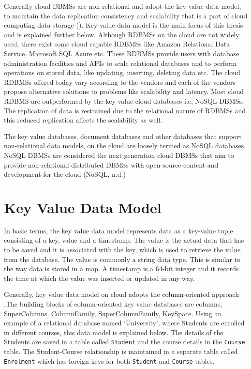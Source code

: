 Generally cloud \acp{DBMS} are non-relational and adopt the key-value data model, to
maintain the data replication consistency and scalability that is a part of
cloud computing data storage (). Key-value data model is the main
focus of this thesis and is explained further below. Although \acp{RDBMS} on the cloud are
not widely used, there exist some cloud capable \acp{RDBMS} like Amazon Relational
Data Service, Microsoft SQL Azure etc. These \acp{RDBMS} provide users with database
administration facilities and APIs to scale relational databases and to perform
operations on stored data, like updating, inserting, deleting data etc. The
cloud \acp{RDBMS} offered today vary according to the vendors and each of the vendors
propose alternative solutions to problems like scalability and latency. Most
cloud \ac{RDBMS} are outperformed by the key-value cloud databases i.e,
\ac{NoSQL} \acp{DBMS}. The replication of data is restrained due to the
relational nature of \acp{RDBMS} and this reduced replication affects the scalability as well.

The key value databases, document databases and other databases that support
non-relational data models, on the cloud are loosely termed as  \ac{NoSQL}
databases. \ac{NoSQL} \acp{DBMS} are considered the next generation cloud \acp{DBMS} that aim to provide non-relational distributed \acp{DBMS} with open-source content and
development for the cloud (\ac{NoSQL}, n.d.)



\section{Key Value Data Model}\label{s:key-value-data-model}
In basic terms, the key value data model represents data as a key-value tuple
consisting of a key, value and a timestamp. The value is the actual data that
has to be saved and it is associated with the key, which is used to retrieve the
value from the database. The value is commonly a string data type. This is
similar to the way data is stored in a map. A timestamp is a 64-bit integer and
it records the time at which the value was inserted or updated in any way.

Generally, key value data model on cloud adopts the column-oriented approach
.The building blocks of column-oriented key value databases are columns,
SuperColumns, ColumnFamily, SuperColumnFamily, KeySpace. Using an example of a
relational database named ‘University’, where Students are enrolled in different
courses, this data model is explained below. The details of the Students are
saved in a table called \texttt{Student} and the course details in the \texttt{Course} table.
The Student-Course relationship is maintained in a separate table called
\texttt{Enrolment} which has foreign keys for both \texttt{Student} and \texttt{Course} tables.

